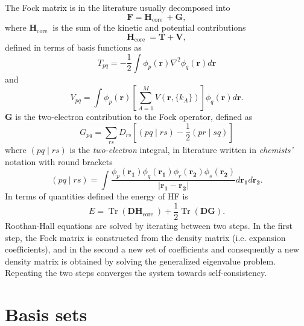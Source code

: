 \documentclass[final,3p,times,twocolumn]{elsarticle}
\begin{document}
	The Fock matrix is in the literature usually decomposed into
	\begin{equation}
		\mathbf{F}=\mathbf{H}_{\text {core }}+\mathbf{G},
	\end{equation}
	where $\mathbf{H}_{\text {core }}$ is the sum of the kinetic and potential contributions
	\begin{equation}
		\mathbf{H}_{\text {core }}=\mathbf{T}+\mathbf{V}, 
	\end{equation}
	defined in terms of basis functions as
	\begin{equation}
		T_{p q}=-\frac{1}{2} \int \phi_{p}(\mathbf{r}) \nabla^{2} \phi_{q}(\mathbf{r}) d \mathbf{r}
	\end{equation}
	and
	\begin{equation}
		V_{p q}=\int \phi_{p}(\mathbf{r})
		\left[\sum_{A=1}^{M} 
		V(\mathbf r, \{k_A\})
		\right] \phi_{q}(\mathbf{r}) d \mathbf{r}. 
	\end{equation}
	$\mathbf{G}$ is the two-electron contribution to the Fock operator, defined as
	\begin{equation}
		G_{p q}=\sum_{r s} D_{r s}\left[(p q \mid r s)-\frac{1}{2}(p r \mid s q)\right]
	\end{equation}
	where $(p q \mid r s)$ is the \emph{two-electron} integral, in literature written in \emph{chemists'} notation with round brackets
	\begin{equation}
		(p q \mid r s)=
		\int \frac{
			\phi_{p}\left(\mathbf{r}_{\mathbf{1}}\right) \phi_{q}\left(\mathbf{r}_{\mathbf{1}}\right) \phi_{r}\left(\mathbf{r}_{\mathbf{2}}\right) \phi_{s}\left(\mathbf{r}_{\mathbf{2}}\right)}{\left|\mathbf{r}_{\mathbf{1}}-\mathbf{r}_{\mathbf{2}}\right|} d \mathbf{r}_{\mathbf{1}} d \mathbf{r}_{\mathbf{2}}.
	\end{equation}
	In terms of quantities defined the energy of HF is
	\begin{equation}
		E=\operatorname{Tr}\left(\mathbf{D H}_{\text {core }}\right)+\frac{1}{2} \operatorname{Tr}(\mathbf{D G}).
	\end{equation}
	Roothan-Hall equations are solved by iterating between two steps. In the first step, the Fock matrix is constructed from the density matrix (i.e. expansion coefficients), and in the second a new set of coefficients and consequently a new density matrix is obtained by solving the generalized eigenvalue problem. Repeating the two steps converges the system towards self-consistency.

	\section{Basis sets}
	\label{app:basissets}
\end{document}
